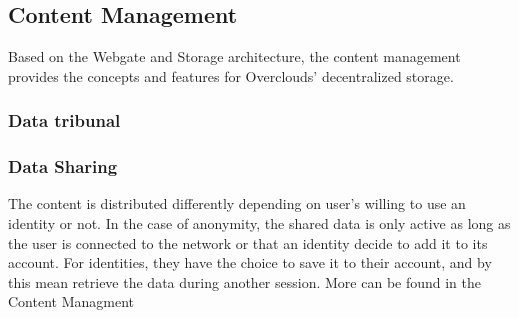 
\subsection{Content Management} Based on the Webgate and Storage architecture, the content management provides the concepts and features for Overclouds' decentralized storage.

\subsubsection{Data tribunal}

\subsubsection{Data Sharing} The content is distributed differently depending on user's willing to use an identity or not. In the case of anonymity, the shared data is only active as long as the user is connected to the network or that an identity decide to add it to its account. For identities, they have the choice to save it to their account, and by this mean retrieve the data during another session. More can be found in the Content Managment 


